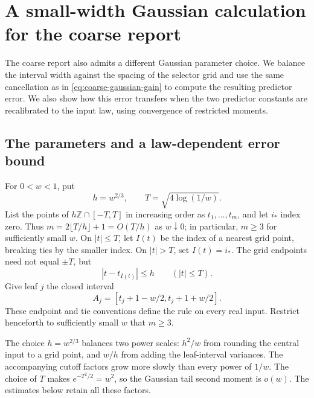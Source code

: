 \section{A small-width Gaussian calculation for the coarse report}
\label{app:small-width}

The coarse report also admits a different Gaussian parameter choice.
We balance the interval width against the spacing of the selector grid
and use the same cancellation as in \eqref{eq:coarse-gaussian-gain}
to compute the resulting predictor error. We also show how this error
transfers when the two predictor constants are recalibrated to the
input law, using convergence of restricted moments.

\subsection{The parameters and a law-dependent error bound}
\label{app:small-width-rule}

For $0<w<1$, put
\begin{equation}\label{app:small-width-schedule}
 h=w^{2/3},\qquad T=\sqrt{4\log(1/w)}.
\end{equation}
List the points of $h\mathbb Z\cap[-T,T]$ in increasing order as
$t_1,\ldots,t_m$, and let $i_*$ index zero.  Thus
$m=2\lfloor T/h\rfloor+1=O(T/h)$ as $w\downarrow0$; in particular,
$m\ge3$ for sufficiently small $w$.  On $|t|\le T$, let $I(t)$
be the index of a nearest grid point, breaking ties by the smaller
index.  On $|t|>T$, set $I(t)=i_*$.  The grid endpoints need not
equal $\pm T$, but
\[
 |t-t_{I(t)}|\le h\qquad (|t|\le T).
\]
Give leaf $j$ the closed interval
\[
 A_j=[t_j+1-w/2,t_j+1+w/2].
\]
These endpoint and tie conventions define the rule on every real input.
Restrict henceforth to sufficiently small $w$ that $m\ge3$.

The choice $h=w^{2/3}$ balances two power scales: $h^2/w$ from
rounding the central input to a grid point, and $w/h$ from adding
the leaf-interval variances. The accompanying cutoff factors grow
more slowly than every power of $1/w$. The choice of $T$ makes
$e^{-T^2/2}=w^2$, so the Gaussian tail second moment is $o(w)$.
The estimates below retain all these factors.


